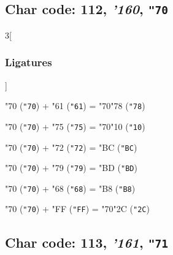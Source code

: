 \documentclass{article}
\newlength{\maxcharwidth}
\begin{document}
\subsection{Char code: 112, {\it'160}, {\tt"70}}
\label{char_112}


\begin{multicols}{3}[\subsubsection{Ligatures}]

{\testfont\char"70\noboundary} ({\tt"70}) + {\testfont\char"61\noboundary} ({\tt"61}) = {\testfont\char"70\noboundary}{\testfont\char"78\noboundary} ({\tt"78}) 

{\testfont\char"70\noboundary} ({\tt"70}) + {\testfont\char"75\noboundary} ({\tt"75}) = {\testfont\char"70\noboundary}{\testfont\char"10\noboundary} ({\tt"10}) 

{\testfont\char"70\noboundary} ({\tt"70}) + {\testfont\char"72\noboundary} ({\tt"72}) = {\testfont\char"BC\noboundary} ({\tt"BC}) 

{\testfont\char"70\noboundary} ({\tt"70}) + {\testfont\char"79\noboundary} ({\tt"79}) = {\testfont\char"BD\noboundary} ({\tt"BD}) 

{\testfont\char"70\noboundary} ({\tt"70}) + {\testfont\char"68\noboundary} ({\tt"68}) = {\testfont\char"B8\noboundary} ({\tt"B8}) 

{\testfont\char"70\noboundary} ({\tt"70}) + {\testfont\char"FF\noboundary} ({\tt"FF}) = {\testfont\char"70\noboundary}{\testfont\char"2C\noboundary} ({\tt"2C}) 

\end{multicols}

\subsection{Char code: 113, {\it'161}, {\tt"71}}
\label{char_113}

\end{document}

